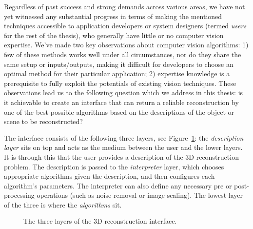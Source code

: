 Regardless of past success and strong demands across various areas, we have not yet witnessed any substantial progress in terms of making the mentioned techniques accessible to application developers or system designers (termed \textit{users} for the rest of the thesis), who generally have little or no computer vision expertise. We've made two key observations about computer vision algorithms: 1) few of these methods works well under all circumstances, nor do they share the same setup or inputs/outputs, making it difficult for developers to choose an optimal method for their particular application; 2) expertise knowledge is a prerequisite to fully exploit the potentials of existing vision techniques. These observations lead us to the following question which we address in this thesis: is it achievable to create an interface that can return a reliable reconstruction by one of the best possible algorithms based on the descriptions of the object or scene to be reconstructed?

The interface consists of the following three layers, see Figure~\ref{fig:interface_overview}: the \textit{description layer} sits on top and acts as the medium between the user and the lower layers. It is through this that the user provides a description of the 3D reconstruction problem. The description is passed to the \textit{interpreter} layer, which chooses appropriate algorithms given the description, and then configures each algorithm's parameters. The interpreter can also define any necessary pre or post-processing operations (such as noise removal or image scaling). The lowest layer of the three is where the \textit{algorithms} sit.
\begin{figure}[!htbp]
\centering
{}
\caption{The three layers of the 3D reconstruction interface.}
\label{fig:interface_overview}
\end{figure}


